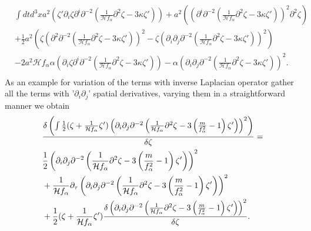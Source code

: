 \documentclass[12pt,a4paper]{article}
\numberwithin{equation}{section}
\numberwithin{equation}{section}
\begin{document}
\begin{equation}
\begin{split}
& \int dt d^3x  a^2\left( \zeta' \partial_i \zeta \partial^i  \partial^{-2}\left( \frac{1}{\mathcal{H} f_{\alpha}}  \partial^2 \zeta-3\kappa \zeta'\right)\right) + a^2\left( \left( \partial^i  \partial^{-2}\left( \frac{1}{\mathcal{H} f_{\alpha}}  \partial^2 \zeta-3\kappa \zeta'\right) \right)^2 \partial^2\zeta\right)\\
&+\frac{1}{2} a^2\left(\zeta \left( \partial^2  \partial^{-2}\left( \frac{1}{\mathcal{H} f_{\alpha}}  \partial^2 \zeta-3\kappa \zeta'\right) \right)^2 - \zeta \left( \partial_i \partial_j  \partial^{-2}\left( \frac{1}{\mathcal{H} f_{\alpha}}  \partial^2 \zeta-3\kappa \zeta'\right) \right)^2\right) \\
    &- 2a^2 \mathcal{H} f_{\alpha} \alpha \left(  \partial_i \zeta \partial^i  \partial^{-2}\left( \frac{1}{\mathcal{H}  f_{\alpha}}  \partial^2 \zeta-3\kappa \zeta'\right)\right) - \alpha \left(\partial_i \partial_j  \partial^{-2}\left( \frac{1}{\mathcal{H}  f_{\alpha}}  \partial^2 \zeta-3\kappa \zeta'\right) \right)^2. \\
    \label{eq:invlap}
\end{split}
\end{equation}
As an example for variation of the terms with inverse Laplacian operator gather all the terms with '$\partial_i \partial_j$' spatial derivatives, varying them in a straightforward manner we obtain
\begin{equation}
\begin{split}
    &\fdv{\left(\int \frac{1}{2} (\zeta+\frac{1}{\mathcal{H}f_{\alpha}} \zeta') \left( \partial_i \partial_j \partial^{-2}\left( \frac{1}{\mathcal{H}  f_{\alpha}}  \partial^2 \zeta-3\left(\frac{m}{f_{\alpha}^2}-1 \right) \zeta' \right)\right)^2\right)}{\zeta} = \\
    & \frac{1}{2} \left( \partial_i \partial_j \partial^{-2}\left( \frac{1}{\mathcal{H}  f_{\alpha}}  \partial^2 \zeta-3\left(\frac{m}{f_{\alpha}^2}-1 \right) \zeta' \right)\right)^2 \\
    &+ \frac{1}{\mathcal{H} f_{\alpha}} \partial_\tau\left( \partial_i \partial_j \partial^{-2}\left( \frac{1}{\mathcal{H}  f_{\alpha}}  \partial^2 \zeta-3\left(\frac{m}{f_{\alpha}^2}-1 \right) \zeta' \right)\right)^2\\
   &+  \frac{1}{2} (\zeta+\frac{1}{\mathcal{H}f_{\alpha}} \zeta') \fdv{ \left( \partial_i \partial_j \partial^{-2}\left( \frac{1}{\mathcal{H}  f_{\alpha}}  \partial^2 \zeta-3\left(\frac{m}{f_{\alpha}^2}-1 \right) \zeta' \right)\right)^2 }{\zeta} .
    \end{split}
    \label{eq:varex}
\end{equation}
\end{document}
